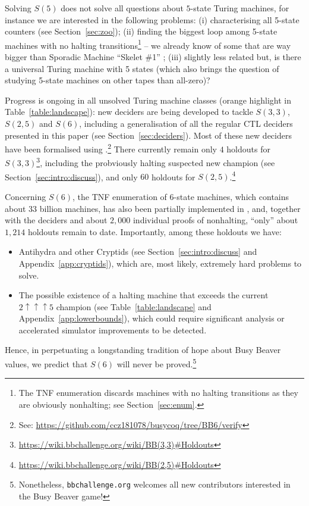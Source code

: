 \documentclass[a4paper,british]{article}
\theoremstyle{definition} %
\numberwithin{equation}{section}
\theoremstyle{definition} %
\newcommand{\numBBsholdouts}{1{,}214}
\begin{document}
Solving $S(5)$ does not solve all questions about $5$-state Turing machines, for instance we are interested in the following problems: (i) characterising all 5-state counters (see Section~\ref{sec:zoo}); (ii) finding the biggest loop among 5-state machines with no halting transitions\footnote{The TNF enumeration discards machines with no halting transitions as they are obviously nonhalting; see Section~\ref{sec:enum}.} -- we already know of some that are way bigger than Sporadic Machine ``Skelet \#1'' \cite{ligocki2022motherofgiants}; (iii) slightly less related but, is there a universal Turing machine with 5 states (which also brings the question of studying 5-state machines on other tapes than all-zero)?

Progress is ongoing in all unsolved Turing machine classes (orange highlight in Table~\ref{table:landscape}): new deciders are being developed to tackle $S(3,3)$, $S(2,5)$ and $S(6)$, including a generalisation of all the regular CTL deciders presented in this paper (see Section~\ref{sec:deciders}). Most of these new deciders have been formalised using \Coq.\footnote{See: \url{https://github.com/ccz181078/busycoq/tree/BB6/verify}} There currently remain only $4$ holdouts for $S(3,3)$\footnote{\url{https://wiki.bbchallenge.org/wiki/BB(3,3)\#Holdouts}}, including the probviously halting suspected new champion (see Section~\ref{sec:intro:discuss}), and only $60$ holdouts for $S(2,5)$.\footnote{\url{https://wiki.bbchallenge.org/wiki/BB(2,5)\#Holdouts}}

Concerning $S(6)$, the TNF enumeration of 6-state machines, which contains about 33 billion machines, has also been partially implemented in \Coq, and, together with the deciders and about $2{,}000$ individual proofs of nonhalting, ``only'' about $\numBBsholdouts$ holdouts remain to date. Importantly, among these holdouts we have:
\begin{itemize}[label=--]
    \item Antihydra and other Cryptids (see Section~\ref{sec:intro:discuss} and Appendix~\ref{app:cryptids}), which are, most likely, extremely hard problems to solve.
    \item The possible existence of a halting machine that exceeds the current $2\uparrow\uparrow\uparrow5$ champion (see Table~\ref{table:landscape} and Appendix~\ref{app:lowerbounds}), which could require significant analysis or accelerated simulator improvements to be detected.
\end{itemize}


Hence, in perpetuating a longstanding tradition of hope about Busy Beaver values, we predict that $S(6)$ will never be proved.\footnote{Nonetheless, \texttt{bbchallenge.org} welcomes all new contributors interested in the Busy Beaver game!}
\end{document}
